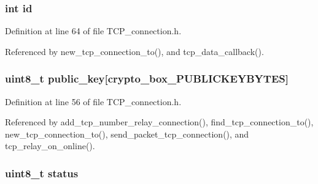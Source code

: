 \hypertarget{struct_t_c_p___connection__to_a7441ef0865bcb3db9b8064dd7375c1ea}{
\subsubsection[{id}]{\setlength{\rightskip}{0pt plus 5cm}int id}}\label{struct_t_c_p___connection__to_a7441ef0865bcb3db9b8064dd7375c1ea}


Definition at line 64 of file T\+C\+P\+\_\+connection.\+h.



Referenced by new\+\_\+tcp\+\_\+connection\+\_\+to(), and tcp\+\_\+data\+\_\+callback().

\hypertarget{struct_t_c_p___connection__to_aaa806bb1136fb3d4b5d8d8970b596ff7}{
\subsubsection[{public\+\_\+key}]{\setlength{\rightskip}{0pt plus 5cm}uint8\+\_\+t public\+\_\+key\mbox{[}crypto\+\_\+box\+\_\+\+P\+U\+B\+L\+I\+C\+K\+E\+Y\+B\+Y\+T\+E\+S\mbox{]}}}\label{struct_t_c_p___connection__to_aaa806bb1136fb3d4b5d8d8970b596ff7}


Definition at line 56 of file T\+C\+P\+\_\+connection.\+h.



Referenced by add\+\_\+tcp\+\_\+number\+\_\+relay\+\_\+connection(), find\+\_\+tcp\+\_\+connection\+\_\+to(), new\+\_\+tcp\+\_\+connection\+\_\+to(), send\+\_\+packet\+\_\+tcp\+\_\+connection(), and tcp\+\_\+relay\+\_\+on\+\_\+online().

\hypertarget{struct_t_c_p___connection__to_ade818037fd6c985038ff29656089758d}{
\subsubsection[{status}]{\setlength{\rightskip}{0pt plus 5cm}uint8\+\_\+t status}}\label{struct_t_c_p___connection__to_ade818037fd6c985038ff29656089758d}


